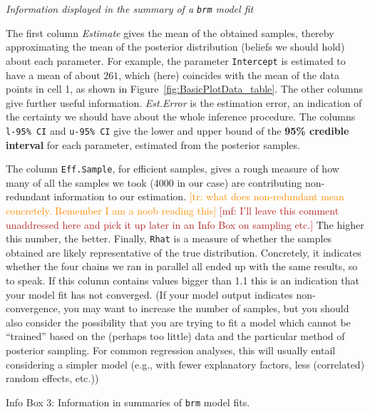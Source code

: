 \documentclass[nobib]{tufte-handout}
\renewcommand{\mf}[1]{\textcolor{firebrick}{[mf: #1]}}
\newcommand{\tr}[1]{\textcolor{DarkOrange}{[tr: #1]}}
\begin{document}
\begin{InfoBox}[t]
\centering
\colorbox{mygray}{\centering
  \begin{minipage}{1.0\textwidth}

    \emph{Information displayed in the summary of a \texttt{brm} model fit}
    \medskip

    The first column \emph{Estimate} gives the mean of the obtained samples, thereby
    approximating the mean of the posterior distribution (beliefs we should hold) about each
    parameter. For example, the parameter \texttt{Intercept} is estimated to have a mean of
    about $261$, which (here) coincides with the mean of the data points in cell 1, as shown in
    Figure~\ref{fig:BasicPlotData_table}. The other columns give further useful information.
    \emph{Est.Error} is the estimation error, an indication of the certainty we should have
    about the whole inference procedure. The columns \texttt{l-95\% CI} and \texttt{u-95\% CI}
    give the lower and upper bound of the \textbf{95\% credible interval} for each parameter,
    estimated from the posterior samples.

    The column \texttt{Eff.Sample}, for efficient samples, gives a rough measure of how many of
    all the samples we took (4000 in our case) are contributing non-redundant information to
    our estimation. \tr{what does non-redundant mean concretely. Remember I am a noob reading
      this} \mf{I'll leave this comment unaddressed here and pick it up later in an Info Box on
      sampling etc.} The higher this number, the better. Finally, \texttt{Rhat} is a measure of
    whether the samples obtained are likely representative of the true distribution.
    Concretely, it indicates whether the four chains we ran in parallel all ended up with the
    same results, so to speak. If this column contains values bigger than 1.1 this is an
    indication that your model fit has not converged. (If your model output indicates
    non-convergence, you may want to increase the number of samples, but you should also
    consider the possibility that you are trying to fit a model which cannot be ``trained''
    based on the (perhaps too little) data and the particular method of posterior sampling. For
    common regression analyses, this will usually entail considering a simpler model (e.g.,
    with fewer explanatory factors, less (correlated) random effects, etc.))
    
  \end{minipage} \par
  } \par
  \begin{center}
    Info Box 3: Information in summaries of \texttt{brm} model fits.
  \end{center}
\end{InfoBox}
\end{document}
